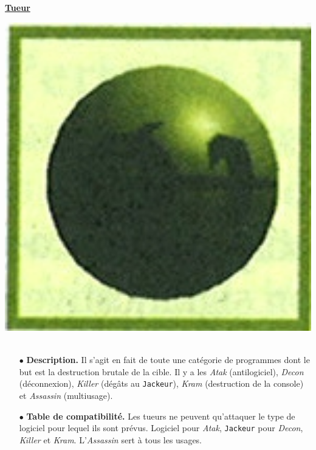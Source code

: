 \documentclass[11pt,twoside,a4paper]{article}
\begin{document}
\begin{multicols*}{2}
\underline{\textbf{Tueur}}~\\
\begin{minipage}[h]{0.12\textwidth}
	\includegraphics[width=1.20\textwidth]{img/catalogueProgrammesTueur01.jpg}~\\
\end{minipage} \hfill \begin{minipage}[h]{0.37\textwidth}
	\begin{itemize}
		\small
		\item[$\bullet$] \textbf{Description. } Il s'agit en fait de toute une cat{\'e}gorie de programmes dont le but est la destruction brutale de la cible. Il y a les \emph{Atak} (antilogiciel), \emph{Decon} (d{\'e}connexion), \emph{Killer} (d{\'e}g{\^a}ts au \texttt{Jackeur}), \emph{Kram} (destruction de la console) et \emph{Assassin} (multiusage). 
	\end{itemize}
\end{minipage}
\begin{itemize}
	\small
	\item[$\bullet$] \textbf{Table de compatibilit{\'e}. }Les tueurs ne peuvent qu'attaquer le type de logiciel pour lequel ils sont pr{\'e}vus. Logiciel pour \emph{Atak}, \texttt{Jackeur} pour \emph{Decon}, \emph{Killer} et \emph{Kram}. L'\emph{Assassin} sert {\`a} tous les usages. 
\end{itemize}

\end{multicols*}
\end{document}
